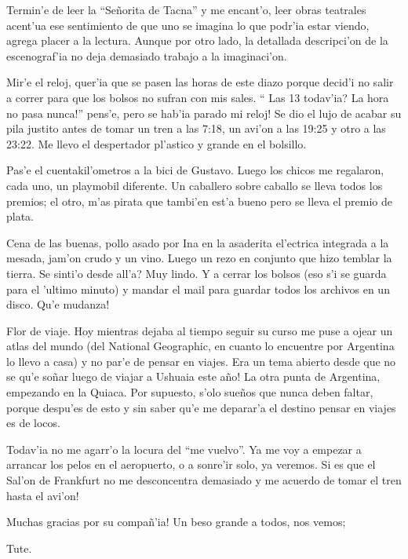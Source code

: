 Termin'e de leer la ``Se\~norita de Tacna'' y me encant'o, leer obras teatrales
acent'ua ese sentimiento de que uno se imagina lo que podr'ia estar viendo,
agrega placer a la lectura. Aunque por otro lado, la detallada descripci'on de
la escenograf'ia no deja demasiado trabajo a la imaginaci'on.

Mir'e el reloj, quer'ia que se pasen las horas de este diazo porque decid'i no
salir a correr para que los bolsos no sufran con mis sales. ``\textquestiondown
Las 13 todav'ia? \textexclamdown La hora no pasa nunca!'' pens'e,
\textexclamdown pero se hab'ia parado mi reloj! Se dio el lujo de acabar su pila
justito antes de tomar un tren a las 7:18, un avi'on a las 19:25 y otro a las
23:22. Me llevo el despertador pl'astico y grande en el bolsillo.

Pas'e el cuentakil'ometros a la bici de Gustavo. Luego los chicos me regalaron,
cada uno, un playmobil diferente. Un caballero sobre caballo se lleva todos los
premios; el otro, m'as pirata que tambi'en est'a bueno pero se lleva el premio
de plata.

Cena de las buenas, pollo asado por Ina en la asaderita el'ectrica integrada a
la mesada, jam'on crudo y un vino. Luego un rezo en conjunto que hizo temblar la
tierra. \textquestiondown Se sinti'o desde all'a? Muy lindo. Y a cerrar los
bolsos (eso s'i se guarda para el 'ultimo minuto) y mandar el mail para guardar
todos los archivos en un disco. \textexclamdown Qu'e mudanza!

Flor de viaje. Hoy mientras dejaba al tiempo seguir su curso me puse a ojear un
atlas del mundo (del National Geographic, en cuanto lo encuentre por Argentina
lo llevo a casa) y no par'e de pensar en viajes. \textexclamdown Era un tema
abierto desde que no se qu'e so\~nar luego de viajar a Ushuaia este a\~no! La
otra punta de Argentina, empezando en la Quiaca. Por supuesto, s'olo sue\~nos
que nunca deben faltar, porque despu'es de esto y sin saber qu'e me deparar'a el
destino pensar en viajes es de locos.

Todav'ia no me agarr'o la locura del ``me vuelvo''. Ya me voy a empezar a
arrancar los pelos en el aeropuerto, o a sonre'ir solo, ya veremos.
\textexclamdown Si es que el Sal'on de Frankfurt no me desconcentra demasiado y
me acuerdo de tomar el tren hasta el avi'on!

\textexclamdown Muchas gracias por su compa\~n'ia! Un beso grande a todos, nos
vemos;

Tute.
